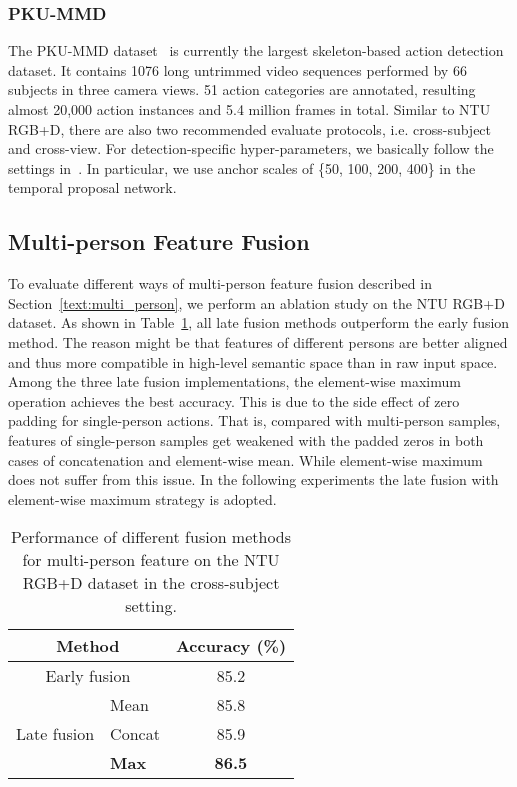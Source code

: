 \documentclass{article}
\begin{document}
\subsubsection{PKU-MMD}
The PKU-MMD dataset~\cite{PKUMMD} is currently the largest skeleton-based action detection dataset. It contains 1076 long untrimmed video sequences performed by 66 subjects in three camera views. 51 action categories are annotated, resulting almost 20,000 action instances and 5.4 million frames in total. Similar to NTU RGB+D, there are also two recommended evaluate protocols, i.e. cross-subject and cross-view. For detection-specific hyper-parameters, we basically follow the settings in~\cite{Ren2015Faster}. In particular, we use anchor scales of \{50, 100, 200, 400\} in the temporal proposal network.

\subsection{Multi-person Feature Fusion}
To evaluate different ways of multi-person feature fusion described in Section~\ref{text:multi_person}, we perform an ablation study on the NTU RGB+D dataset. As shown in Table~\ref{table:multi_person_fusion}, all late fusion methods outperform the early fusion method. The reason might be that features of different persons are better aligned and thus more compatible in high-level semantic space than in raw input space. Among the three late fusion implementations, the element-wise maximum operation achieves the best accuracy. This is due to the side effect of zero padding for single-person actions. That is, compared with multi-person samples, features of single-person samples get weakened with the padded zeros in both cases of concatenation and element-wise mean. While element-wise maximum does not suffer from this issue. In the following experiments the late fusion with element-wise maximum strategy is adopted.

\begin{table}[htbp]
  \centering
  \begin{tabular}{c|l|c}\hline
    \multicolumn{2}{c|}{Method} & Accuracy (\%) \\ \hline
    \multicolumn{2}{c|}{Early fusion} & 85.2 \\ \hline
    \multirow{3}{*}{Late fusion} &Mean &85.8 \\ 
     &Concat &85.9 \\ 
    &{\bfseries Max} &{\bfseries 86.5} \\ \hline
  \end{tabular}
\caption{Performance of different fusion methods for multi-person feature on the NTU RGB+D dataset in the cross-subject setting.}
  \label{table:multi_person_fusion}
\end{table}
\end{document}
